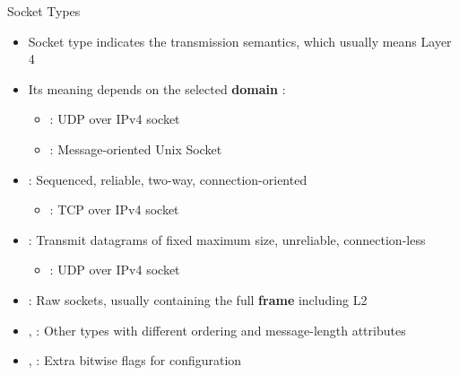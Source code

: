 \begin{frame}{Socket Types}
	\begin{itemize}
		\item Socket type indicates the transmission semantics, which usually means Layer 4
		\item Its meaning depends on the selected \textbf{domain} :
			\begin{itemize}
				\item {} : UDP over IPv4 socket
				\item {} : Message-oriented Unix Socket
			\end{itemize}
		\item {} : Sequenced, reliable, two-way, connection-oriented
			\begin{itemize}
				\item {} : TCP over IPv4 socket
			\end{itemize}
		\item {} : Transmit datagrams of fixed maximum size, unreliable, connection-less
			\begin{itemize}
				\item {} : UDP over IPv4 socket
			\end{itemize}
		\item {} : Raw sockets, usually containing the full \textbf{frame} including L2
		\item {},  : Other types with different ordering and message-length attributes
		\item {},  : Extra bitwise flags for configuration

	\end{itemize}
\end{frame}

